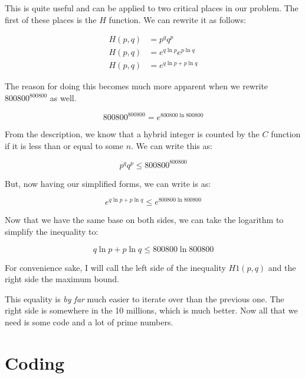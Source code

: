 \documentclass[13pt]{article}
\begin{document}
This is quite useful and can be applied to two critical places in our problem. The first of these places is the $H$ function. We can rewrite it as follows:

\begin{equation}
\begin{split}
H(p, q) &= p^qq^p \\
H(p, q) &= e^{q \ln{p}}e^{p \ln{q}} \\
H(p, q) &= e^{q \ln{p} + p \ln{q}}
\end{split}
\end{equation}

The reason for doing this becomes much more apparent when we rewrite $800800^{800800}$ as well.

\begin{equation}
800800^{800800} = e^{800800 \ln{800800}}
\end{equation}

From the description, we know that a hybrid integer is counted by the $C$ function if it is less than or equal to some $n$. We can write this as:

\begin{equation}
p^qq^p \le 800800^{800800}
\end{equation}

But, now having our simplified forms, we can write is as:

\begin{equation}
e^{q \ln{p} + p \ln{q}} \le e^{800800 \ln{800800}}
\end{equation}

Now that we have the same base on both sides, we can take the logarithm to simplify the inequality to:

\begin{equation}
q \ln{p} + p \ln{q} \le 800800 \ln{800800}
\end{equation}

For convenience sake, I will call the left side of the inequality $H1(p, q)$ and the right side the maximum bound.

This equality is \textit{by far} much easier to iterate over than the previous one. The right side is somewhere in the 10 millions, which is much better. Now all that we need is some code and a lot of prime numbers.

\section{Coding}
\end{document}
